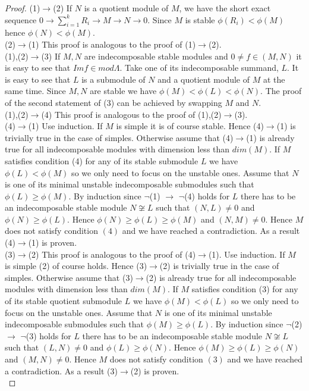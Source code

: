 \begin{proof}
\indent (1)$\to$(2) If $N$ is a quotient module of $M$, we have the short exact sequence $0\to\sum_{i=1}^kR_i\to M\to N\to 0$. Since $M$ is stable $\phi(R_i)<\phi(M)$ hence $\phi(N)<\phi(M)$.\\
\indent (2)$\to$(1) This proof is analogous to the proof of (1)$\to$(2).\\
\indent (1),(2)$\to$(3) If $M,N$ are indecomposable stable modules and $0\neq f\in(M,N)$ it is easy to see that $Im f\in mod\Lambda$. Take one of its indecomposable summand, $L$. It is easy to see that $L$ is a submodule of $N$ and a quotient module of $M$ at the same time. Since $M,N$ are stable we have $\phi(M)<\phi(L)<\phi(N)$. The proof of the second statement of (3) can be achieved by swapping $M$ and $N$.\\
\indent (1),(2)$\to$(4) This proof is analogous to the proof of (1),(2)$\to$(3).\\
\indent (4)$\to$(1) Use induction. If $M$ is simple it is of course stable. Hence (4)$\to$(1) is trivially true in the case of simples. Otherwise assume that (4)$\to$(1) is already true for all indecomposable modules with dimension less than $dim(M)$. If $M$ satisfies condition (4) for any of its stable submodule $L$ we have $\phi(L)<\phi(M)$ so we only need to focus on the unstable ones. Assume that $N$ is one of its minimal unstable indecomposable submodules such that $\phi(L)\geq\phi(M)$. By induction since $\lnot$(1) $\to$ $\lnot$(4) holds for $L$ there has to be an indecomposable stable module $N\not\cong L$ such that $(N,L)\neq 0$ and $\phi(N)\geq \phi(L)$. Hence $\phi(N)\geq\phi(L)\geq\phi(M)$ and $(N,M)\neq 0$. Hence $M$ does not satisfy condition $(4)$ and we have reached a contradiction. As a result (4)$\to$(1) is proven.\\
\indent (3)$\to$(2) This proof is analogous to the proof of (4)$\to$(1). Use induction. If $M$ is simple (2) of course holds. Hence (3)$\to$(2) is trivially true in the case of simples. Otherwise assume that (3)$\to$(2) is already true for all indecomposable modules with dimension less than $dim(M)$. If $M$ satisfies condition (3) for any of its stable quotient submodule $L$ we have $\phi(M)<\phi(L)$ so we only need to focus on the unstable ones. Assume that $N$ is one of its minimal unstable indecomposable submodules such that $\phi(M)\geq\phi(L)$. By induction since $\lnot$(2) $\to$ $\lnot$(3) holds for $L$ there has to be an indecomposable stable module $N\not\cong L$ such that $(L,N)\neq 0$ and $\phi(L)\geq \phi(N)$. Hence $\phi(M)\geq\phi(L)\geq\phi(N)$ and $(M,N)\neq 0$. Hence $M$ does not satisfy condition $(3)$ and we have reached a contradiction. As a result (3)$\to$(2) is proven.\\
\end{proof}
